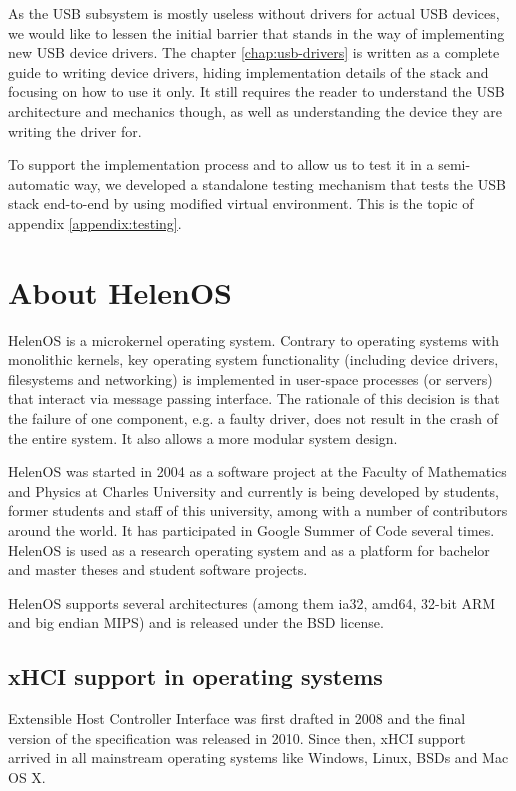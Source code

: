 As the USB subsystem is mostly useless without drivers for actual USB devices,
we would like to lessen the initial barrier that stands in the way of
implementing new USB device drivers. The chapter \ref{chap:usb-drivers} is
written as a complete guide to writing device drivers, hiding implementation
details of the stack and focusing on how to use it only. It still requires the
reader to understand the USB architecture and mechanics though, as well as
understanding the device they are writing the driver for.

To support the implementation process and to allow us to test it in
a semi-automatic way, we developed a standalone testing mechanism that tests
the USB stack end-to-end by using modified virtual environment. This is the
topic of appendix \ref{appendix:testing}.

\section{About HelenOS}
HelenOS is a microkernel operating system. Contrary to operating systems with
monolithic kernels, key operating system functionality (including device
drivers, filesystems and networking) is implemented in user-space processes (or
servers) that interact via message passing interface. The rationale of this
decision is that the failure of one component, e.g. a faulty driver, does not
result in the crash of the entire system. It also allows a more modular system
design.

HelenOS was started in 2004 as a software project at the Faculty of Mathematics
and Physics at Charles University and currently is being developed by students,
former students and staff of this university, among with a number of
contributors around the world. It has participated in Google Summer of Code
several times. HelenOS is used as a research operating system and as a platform
for bachelor and master theses and student software projects.

HelenOS supports several architectures (among them ia32, amd64, 32-bit ARM and
big endian MIPS) and is released under the BSD license.

\subsection{xHCI support in operating systems}

Extensible Host Controller Interface was first drafted in 2008 and the final
version of the specification was released in 2010. Since then, xHCI support
arrived in all mainstream operating systems like Windows, Linux, BSDs and Mac
OS X.

